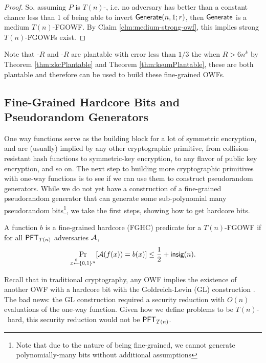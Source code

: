 \begin{proof}
	So, assuming $P$ is $T(n)$-\ACIH, i.e. no adversary has better than a constant chance less than 1 of being able to invert $\mathsf{Generate}(n,1; r)$, then $\mathsf{Generate}$ is a medium $T(n)$-FGOWF. By Claim \ref{clm:medium-strong-owf}, this implies strong $T(n)$-FGOWFs exist.
\end{proof}

Note that \kSum-$R$ and \zkclique-$R$ are plantable with error less than $1/3$ the when $R > 6 n^k$ by Theorem \ref{thm:zkcPlantable} and Theorem \ref{thm:ksumPlantable}, these are both plantable and therefore can be used to build these fine-grained OWFs.

\subsection{Fine-Grained Hardcore Bits and Pseudorandom Generators}\label{sec:fg-hardcore-bits}
One way functions serve as the building block for a lot of symmetric encryption, and are (usually) implied by any other cryptographic primitive, from collision-resistant hash functions to symmetric-key encryption, to any flavor of public key encryption, and so on. The next step to building more cryptographic primitives with one-way functions is to see if we can use them to construct pseudorandom generators. While we do not yet have a construction of a fine-grained pseudorandom generator that can generate some sub-polynomial many pseudorandom bits\footnote{Note that due to the nature of being fine-grained, we cannot generate polynomially-many bits without additional assumptions}, we take the first steps, showing how to get hardcore bits.

\begin{definition}\label{def:fg-hcb}
	A function $b$ is a fine-grained hardcore (FGHC) predicate for a $T(n)$-FGOWF if for all $\mathsf{PFT}_{T(n)}$ adversaries $\mathcal{A}$,
	\[ \Pr_{x \stackrel{\scriptscriptstyle{\$}}{\gets} \{0,1\}^n}[ \mathcal{A}(f(x)) = b(x) ] \le \frac 1 2 + \mathsf{insig}(n). \]
\end{definition}

Recall that in traditional cryptography, any OWF implies the existence of another OWF with a hardcore bit with the Goldreich-Levin (GL) construction \cite{hardCoreBitsAndXorLemmaFromGL}. The bad news: the GL construction required a security reduction with $O(n)$ evaluations of the one-way function. Given how we define problems to be $T(n)$-\ACIH~hard, this security reduction would not be $\mathsf{PFT}_{T(n)}$.


